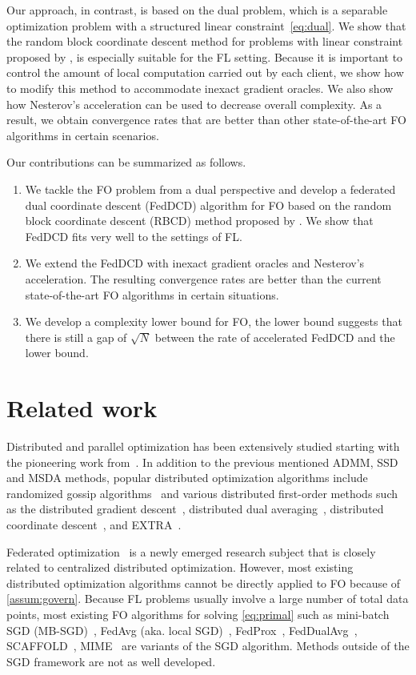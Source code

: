 Our approach, in contrast, is based on the dual problem, which is a separable optimization problem with a structured linear constraint~\eqref{eq:dual}. We show that the random block coordinate descent method for problems with linear constraint proposed by \citet{necoara2017random}, is especially suitable for the FL setting. Because it is important to control the amount of local computation carried out by each client, we show how to modify this method to accommodate inexact gradient oracles. We also show how Nesterov's acceleration can be used to decrease overall complexity. As a result, we obtain convergence rates that are better than other state-of-the-art FO algorithms in certain scenarios. 


Our contributions can be summarized as follows. 
\begin{enumerate}
    \item We tackle the FO problem from a dual perspective and develop a federated dual coordinate descent (FedDCD) algorithm for FO based on the random block coordinate descent (RBCD) method proposed by \citet{necoara2017random}. We show that FedDCD fits very well to the settings of FL. 
    \item We extend the FedDCD with inexact gradient oracles and Nesterov's acceleration. The resulting convergence rates are better than the current state-of-the-art FO algorithms in certain situations.
    \item We develop a complexity lower bound for FO, the lower bound suggests that there is still a gap of $\sqrt{N}$ between the rate of accelerated FedDCD and the lower bound.
\end{enumerate}

\section{Related work}
\label{sec:relatedWork}

Distributed and parallel optimization has been extensively studied starting with the pioneering work from~\citet{Bertsekas89}. In addition to the previous mentioned ADMM, SSD and MSDA methods, popular distributed optimization algorithms include randomized gossip algorithms~\citep{BoydGPS06} and various distributed first-order methods such as the distributed gradient descent~\citep{NedicO09}, distributed dual averaging~\citep{DuchiAW12}, distributed coordinate descent~\citep{RichtarikT16}, and EXTRA~\citep{ShiLWY15}.

Federated optimization~\citep{wang2021field} is a newly emerged research subject that is closely related to centralized distributed optimization. However, most existing distributed optimization algorithms cannot be directly applied to FO because of \autoref{assum:govern}. Because FL problems usually involve a large number of total data points, most existing FO algorithms for solving \eqref{eq:primal} such as mini-batch SGD (MB-SGD)~\citep{WoodworthPS20}, FedAvg (aka. local SGD)~\citep{McMahan17}, FedProx~\citep{li2018federated}, FedDualAvg~\citep{yuan2021federated},  SCAFFOLD~\citep{pmlr-v119-karimireddy20a}, MIME~\citep{karimireddy2020mime} are variants of the SGD algorithm. Methods outside of the SGD framework are not as well developed. 

